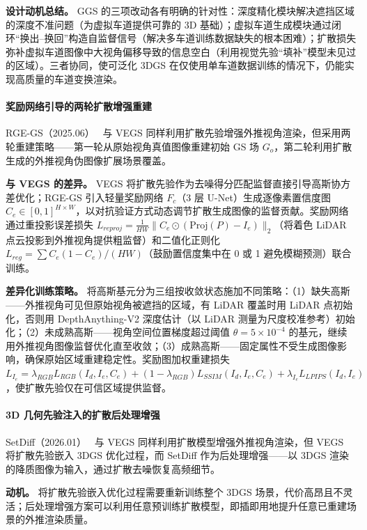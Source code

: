 \textbf{设计动机总结。} GGS 的三项改动各有明确的针对性：深度精化模块解决遮挡区域的深度不准问题（为虚拟车道提供可靠的 3D 基础）；虚拟车道生成模块通过闭环``换出--换回''构造自监督信号（解决多车道训练数据缺失的根本困难）；扩散损失弥补虚拟车道图像中大视角偏移导致的信息空白（利用视觉先验``填补''模型未见过的区域）。三者协同，使可泛化 3DGS 在仅使用单车道数据训练的情况下，仍能实现高质量的车道变换渲染。

\paragraph{奖励网络引导的两轮扩散增强重建}

RGE-GS（2025.06）~\cite{2506_22800} 与 VEGS 同样利用扩散先验增强外推视角渲染，但采用两轮重建策略——第一轮从原始视角真值图像重建初始 GS 场 $G_o$，第二轮利用扩散生成的外推视角伪图像扩展场景覆盖。

\textbf{与 VEGS 的差异。} VEGS 将扩散先验作为去噪得分匹配监督直接引导高斯协方差优化；RGE-GS 引入轻量奖励网络 $F_c$（3 层 U-Net）生成逐像素置信度图 $C_e \in [0,1]^{H \times W}$，以对抗验证方式动态调节扩散生成图像的监督贡献。奖励网络通过重投影误差损失 $L_{reproj} = \frac{1}{HW}\|C_e \odot (\text{Proj}(P) - I_e)\|_2$（将着色 LiDAR 点云投影到外推视角提供粗监督）和二值化正则化 $L_{reg} = \sum C_e(1-C_e)/(HW)$（鼓励置信度集中在 0 或 1 避免模糊预测）联合训练。

\textbf{差异化训练策略。} 将高斯基元分为三组按收敛状态施加不同策略：（1）缺失高斯——外推视角可见但原始视角被遮挡的区域，有 LiDAR 覆盖时用 LiDAR 点初始化，否则用 DepthAnything-V2 深度估计（以 LiDAR 测量为尺度校准参考）初始化；（2）未成熟高斯——视角空间位置梯度超过阈值 $\theta = 5 \times 10^{-4}$ 的基元，继续用外推视角图像监督优化直至收敛；（3）成熟高斯——固定属性不受生成图像影响，确保原始区域重建稳定性。奖励图加权重建损失 $L_{I_e} = \lambda_{RGB} L_{RGB}(I_d, I_e, C_e) + (1-\lambda_{RGB}) L_{SSIM}(I_d, I_e, C_e) + \lambda_{I_e} L_{LPIPS}(I_d, I_e)$，使扩散先验仅在可信区域提供监督。

\paragraph{3D 几何先验注入的扩散后处理增强}

SetDiff（2026.01）~\cite{2601_07540} 与 VEGS 同样利用扩散模型增强外推视角渲染，但 VEGS 将扩散先验嵌入 3DGS 优化过程，而 SetDiff 作为后处理增强——以 3DGS 渲染的降质图像为输入，通过扩散去噪恢复高频细节。

\textbf{动机。} 将扩散先验嵌入优化过程需要重新训练整个 3DGS 场景，代价高昂且不灵活；后处理增强方案可以利用任意预训练扩散模型，即插即用地提升任意已重建场景的外推渲染质量。

